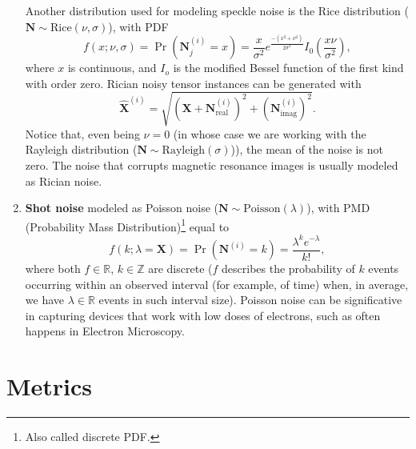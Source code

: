 \documentclass{article}
\begin{document}
\begin{enumerate}
  Another distribution used for modeling speckle noise is the Rice
  distribution ($\mathbf{N}\sim\mathrm{Rice}(\nu,\sigma)$), with PDF
  \begin{equation}
    f(x; \nu,\sigma) = \Pr({\mathbf N}^{(i)}_j{=}x) = \frac{x}{\sigma^2}e^{\frac{-(x^2+\nu^2)}{2\sigma^2}}I_0\left(\frac{x\nu}{\sigma^2}\right),
  \end{equation}
  where $x$ is continuous, and $I_o$ is the modified Bessel function
  of the first kind with order zero. Rician noisy tensor instances can
  be generated with
  \begin{equation}
    \hat{\mathbf X}^{(i)} = \sqrt{ ({\mathbf X} + {\mathbf N}_{\text{real}}^{(i)})^2 + ({\mathbf N}_{\text{imag}}^{(i)})^2}.
  \end{equation}
  Notice that, even being $\nu=0$ (in whose case we are working with
  the Rayleigh distribution
  ($\mathbf{N}\sim\mathrm{Rayleigh}(\sigma)$)), the mean of the noise
  is not zero. The noise that corrupts magnetic resonance images is
  usually modeled as Rician noise.
  
\item \textbf{Shot noise} modeled as Poisson noise
  ($\mathbf{N}\sim\mathrm{Poisson}(\lambda)$), with PMD (Probability Mass
  Distribution)\footnote{Also called discrete PDF.} equal to
  \begin{equation}
    f(k; \lambda={\mathbf X}) = \Pr({\mathbf N}^{(i)}{=}k) = \frac{\lambda^k e^{-\lambda}}{k!},
    \label{eq:PN}
  \end{equation}
  where both $f\in\mathbb{R}$, $k\in\mathbb{Z}$ are discrete ($f$
  describes the probability of $k$ events occurring within an observed
  interval (for example, of time) when, in average, we have
  $\lambda\in\mathbb{R}$ events in such interval size). Poisson noise
  can be significative in capturing devices that work with low doses
  of electrons, such as often happens in Electron Microscopy.
\end{enumerate}

\section{Metrics}
\end{document}
